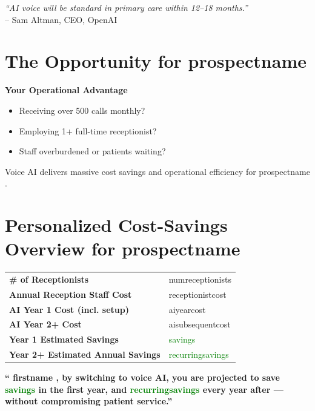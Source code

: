 \documentclass[10pt]{article}
\newcommand{\prospectname}{{ prospectname }}
\newcommand{\firstname}{{ firstname }}
\newcommand{\numreceptionists}{{ numreceptionists }}
\newcommand{\receptionistcost}{{ receptionistcost }}
\newcommand{\aiyearcost}{{ aiyearcost }}
\newcommand{\aisubsequentcost}{{ aisubsequentcost }}
\newcommand{\savings}{{ savings }}
\newcommand{\recurringsavings}{{ recurringsavings }}
\begin{document}
\vspace{1cm}
\begin{flushright}
    \textit{``AI voice will be standard in primary care within 12--18 months.''} \\
    -- Sam Altman, CEO, OpenAI
\end{flushright}

\vspace{1cm}

\section*{The Opportunity for \prospectname}
\textbf{Your Operational Advantage}
\begin{itemize}
    \item Receiving over 500 calls monthly?
    \item Employing 1+ full-time receptionist?
    \item Staff overburdened or patients waiting?
\end{itemize}

\newpage
Voice AI delivers massive cost savings and operational efficiency for \prospectname.

\vspace{0.5cm}

\section*{Personalized Cost-Savings Overview for \prospectname}
\begin{tabular}{ll}
    \toprule
    \textbf{\# of Receptionists} & \numreceptionists \\
    \textbf{Annual Reception Staff Cost} & \receptionistcost \\
    \textbf{AI Year 1 Cost (incl. setup)} & \aiyearcost \\
    \textbf{AI Year 2+ Cost} & \aisubsequentcost \\
    \textbf{Year 1 Estimated Savings} & \textcolor{green}{\savings} \\
    \textbf{Year 2+ Estimated Annual Savings} & \textcolor{green}{\recurringsavings} \\
    \bottomrule
\end{tabular}

\vspace{0.5cm}
\textbf{“\firstname, by switching to voice AI, you are projected to save \textcolor{green}{\savings} in the first year, and \textcolor{green}{\recurringsavings} every year after — without compromising patient service.”}
\end{document}
